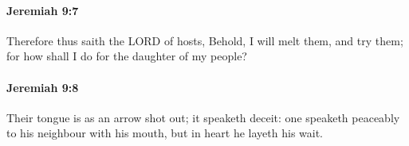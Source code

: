 		\paragraph{Jeremiah 9:7} %
			\label{JEREMIAH-9-7}

			Therefore thus saith the LORD of hosts, Behold, I will melt them, and try them; for how shall I do for the daughter of my people?


		\paragraph{Jeremiah 9:8} %
			\label{JEREMIAH-9-8}

			Their tongue is as an arrow shot out; it speaketh deceit: one speaketh peaceably to his neighbour with his mouth, but in heart he layeth his wait.


